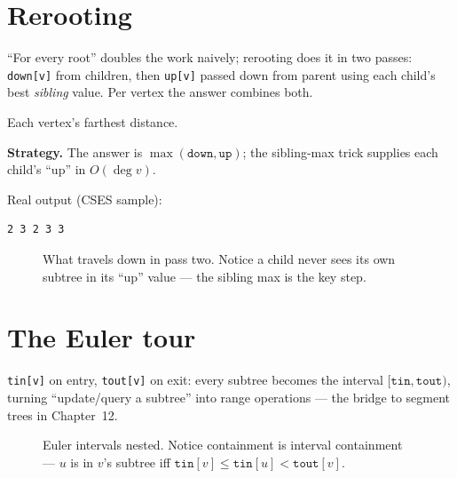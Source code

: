 \section{Rerooting}\label{sec:reroot}
``For every root'' doubles the work naively; rerooting does it in
two passes: \texttt{down[v]} from children, then \texttt{up[v]}
passed down from parent using each child's best \emph{sibling}
value. Per vertex the answer combines both.
\begin{example}\label{ex:dist2}
Each vertex's farthest distance.
\par\smallskip
\textbf{Strategy.} The answer is $\max(\texttt{down},\texttt{up})$;
the sibling-max trick supplies each child's ``up'' in $O(\deg v)$.
\par\smallskip
\begin{solution}

Real output (CSES sample):
\begin{lstlisting}[numbers=none]
2 3 2 3 3
\end{lstlisting}
\end{solution}
\end{example}
\begin{figure}[ht]\centering

\caption{What travels down in pass two. Notice a child never sees its
own subtree in its ``up'' value --- the sibling max is the key step.}
\label{fig:reroot}
\end{figure}

\section{The Euler tour}\label{sec:euler}
\texttt{tin[v]} on entry, \texttt{tout[v]} on exit: every subtree
becomes the interval $[\texttt{tin},\texttt{tout})$, turning
``update/query a subtree'' into range operations --- the bridge to
segment trees in Chapter~12.
\begin{figure}[ht]\centering

\caption{Euler intervals nested. Notice containment is interval
containment --- $u$ is in $v$'s subtree iff
$\texttt{tin}[v]\le\texttt{tin}[u]<\texttt{tout}[v]$.}
\label{fig:euler}
\end{figure}

